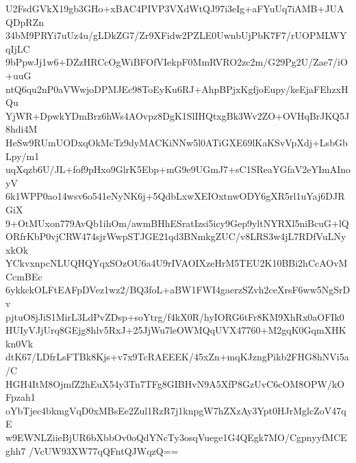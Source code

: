 U2FsdGVkX19gb3GHo+xBAC4PIVP3VXdWtQJ97i3eIg+aFYuUq7iAMB+JUAQDpRZn
34bM9PRYi7uUz4u/gLDkZG7/Zr9XFidw2PZLE0UwnbUjPbK7F7/rUOPMLWYqIjLC
9bPpwJj1w6+DZzHRCcOgWiBFOfVIekpF0MmRVRO2zc2m/G29Pg2U/Zae7/iO+uuG
ntQ6qu2nP0aVWwjoDPMJEc98ToEyKu6RJ+AhpBPjxKgfjoEupy/keEjaFEhzxHQu
YjWR+DpwkYDmBrz6hWs4AOvpz8DgK1SlIHQtxgBk3Wv2ZO+OVHqBrJKQ5J8hdi4M
HeSw9RUmUODxqOkMcTz9dyMACKiNNw5l0ATiGXE69lKaKSvVpXdj+LsbGbLpy/m1
uqXqzb6U/JL+fof9pHxo9GlrK5Ebp+mG9e9UGmJ7+sC1SReaYGfaV2eYImAInoyV
6k1WPP0ao14wsv6o541eNyNK6j+5QdbLxwXEIOxtnwODY6gXR5rl1uYaj6DJRGiX
9+OtMUxon779AvQb1ihOm/awmBHhESratIzsi5icy9Gep9yltNYRXl5niBcuG+lQ
ORfrKbP0vjCRW474sjrWwpSTJGE21qd3BNmkgZUC/v8LRS3w4jL7RDfVuLNyxkOk
YCkvxnpcNLUQHQYqxSOzOU6a4U9rIVAOIXzeHrM5TEU2K10BBi2hCcAOvMCcmBEc
6ykkckOLFtEAFpDVez1wz2/BQ3foL+aBW1FWI4gaerzSZvh2ceXrsF6ww5NgSrDv
pjtuO8jJiS1MirL3LdPvZDsp+soYtrg/f4kX0R/hyIORG6tFr8KM9XhRx0aOFIk0
HUIyVJjUrq8GEjg8hlv5RxJ+25JjWu7leOWMQqUVX47760+M2gqK0GqmXHKkn0Vk
dtK67/LDfrLsFTBk8Kjs+v7x9TcRAEEEK/45xZn+mqKJzngPikb2FHG8hNVi5a/C
HGH4ItM8OjmfZ2hEuX54y3Tn7TFg8GIBHvN9A5XfP8GzUvC6cOM8OPW/kOFpzah1
oYbTjec4bkmgVqD0xMBsEe2Zul1RzR7j1knpgW7hZXzAy3Ypt0HJrMglcZoV47qE
w9EWNLZiieBjUR6bXbbOv0oQdYNcTy3osqVuege1G4QEgk7MO/CgpnyyfMCEghh7
/VcUW93XW77qQFntQJWqzQ==
